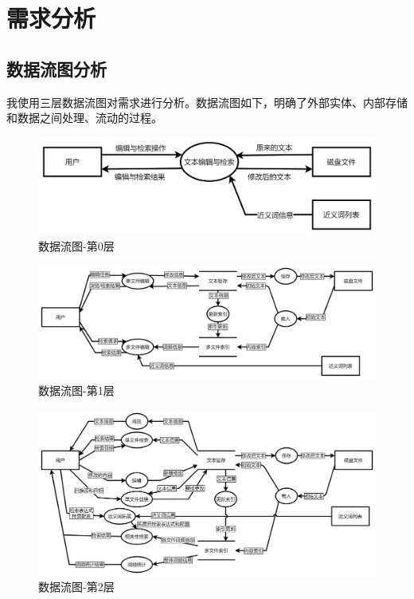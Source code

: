 \documentclass[scheme = chinese]{ctexart}
\begin{document}
\clearpage

\section{需求分析}
\subsection{数据流图分析}

我使用三层数据流图对需求进行分析。数据流图如下，明确了外部实体、内部存储和数据之间处理、流动的过程。

\begin{figure}[h]
    \centering
    \includegraphics[width=\textwidth]{images/数据流图-第0层.png}
    \caption{数据流图-第0层}
\end{figure}

\begin{figure}[h]
    \centering
    \includegraphics[width=\textwidth]{images/数据流图-第1层.png}
    \caption{数据流图-第1层}
\end{figure}

\begin{figure}[H]
    \centering
    \includegraphics[width=\textwidth]{images/数据流图-第2层.png}
    \caption{数据流图-第2层}
\end{figure}
\end{document}
